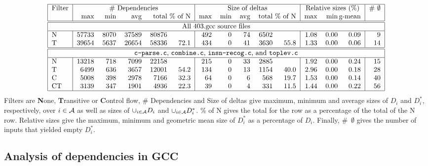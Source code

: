 \documentclass[times, 10pt,twocolumn]{article}
\begin{document}
\begin{table*}
\[
\begin{tabular}{|l|rrrr@{\ }r|rrrr@{\ }r|rr@{\,}r|r|} \hline
Filter & \multicolumn{5}{c|}{\# Dependencies} 
     & \multicolumn{5}{c|}{Size of deltas}
     & \multicolumn{3}{c|}{Relative sizes (\%)}
     & \# $\emptyset$  \\
     & max & min & avg & total & \% of N
     & max & min & avg & total & \% of N
     & max & min & g-mean & \\ \hline \hline
\multicolumn{15}{|c|}{ All 403.gcc source files } \\ \hline
N & 57733 & 8070 & 37589  & 80876 &  & 492 & 0 & 74  & 6502 &  & 1.08 & 0.00 & 0.09 & 9 \\
T & 39654 & 5637 & 26654  & 58336 & 72.1  & 434 & 0 & 41  & 3630 & 55.8  & 1.33 & 0.00 & 0.06 & 14 \\
\hline \hline
\multicolumn{15}{|c|}{ {\tt c-parse.c}, {\tt combine.c}, 
  {\tt insn-recog.c}, and {\tt toplev.c} } \\
\hline
N & 13218 & 718 & 7099  & 22158 &  & 215 & 0 & 33  & 2885 &  & 1.92 & 0.00 & 0.24 & 15 \\
T & 6499 & 636 & 3657  & 12001 & 54.2  & 134 & 0 & 13  & 1154 & 40.0  & 2.96 & 0.00 & 0.18 & 28 \\
C & 5008 & 398 & 2978  & 7166 & 32.3  & 64 & 0 & 6  & 568 & 19.7  & 1.53 & 0.00 & 0.14 & 40 \\
CT & 3139 & 347 & 1901  & 4936 & 22.3  & 39 & 0 & 4  & 331 & 11.5  & 1.44 & 0.00 & 0.22 & 56 \\
\hline
\end{tabular}
\]
Filters are {\bf N}one, {\bf T}ransitive or {\bf C}ontrol flow, \# Dependencies and Size of deltas
give maximum, minimum and average sizes of $D_i$ and $D_i^{\ast}$, respectively, over $i\in \cal A$
as well as sizes of $\cup_{i \in \cal A} D_i$ and $\cup_{i \in \cal A} D_i^{\ast}$. \% of N gives 
the total for the row as a percentage of the total of the N row. Relative sizes give the maximum, 
minimum and geometric mean size of $D_i^{\ast}$ as a percentage of $D_i$. Finally, \#~$\emptyset$
gives the number of inputs that yielded empty $D_i^{\ast}$.
\caption{Dependence statistics} \label{tdepstat}
\end{table*}

\subsection{Analysis of dependencies in GCC} \label{sgcc}
\end{document}
